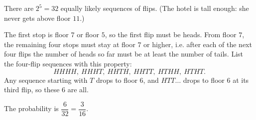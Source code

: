 There are $2^5=32$ equally likely sequences of flips. (The hotel is tall enough: she never gets above floor $11$.)

The first stop is floor $7$ or floor $5$, so the first flip must be heads. From floor $7$, the remaining four stops must stay at floor $7$ or higher, i.e. after each of the next four flips the number of heads so far must be at least the number of tails. List the four-flip sequences with this property:
\[HHHH,\ HHHT,\ HHTH,\ HHTT,\ HTHH,\ HTHT.\]
Any sequence starting with $T$ drops to floor $6$, and $HTT\ldots$ drops to floor $6$ at its third flip, so these $6$ are all.

The probability is $\dfrac{6}{32}=\boxed{\dfrac{3}{16}}$.
